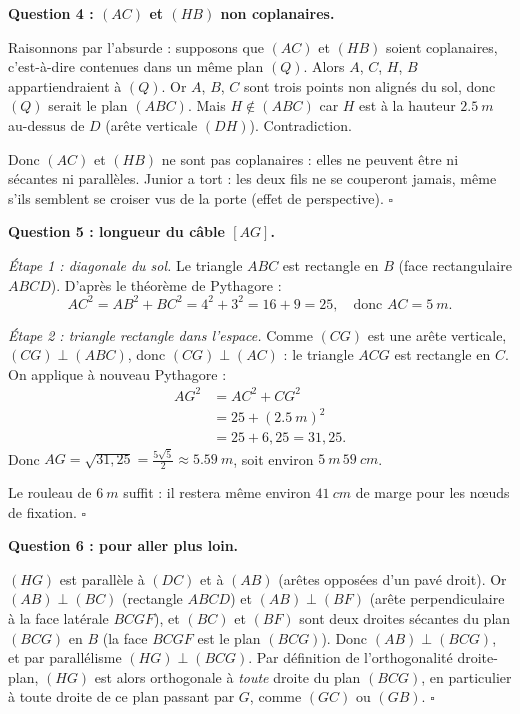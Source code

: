 \documentclass[11pt]{article}
\begin{document}
\begin{exoresolu}
\medskip
\textbf{Question 4 : $(AC)$ et $(HB)$ non coplanaires.}

Raisonnons par l'absurde : supposons que $(AC)$ et $(HB)$ soient coplanaires, c'est-à-dire contenues dans un même plan $(Q)$. Alors $A$, $C$, $H$, $B$ appartiendraient à $(Q)$. Or $A$, $B$, $C$ sont trois points non alignés du sol, donc $(Q)$ serait le plan $(ABC)$. Mais $H \notin (ABC)$ car $H$ est à la hauteur $\SI{2,5}{m}$ au-dessus de $D$ (arête verticale $(DH)$). Contradiction.

Donc $(AC)$ et $(HB)$ ne sont pas coplanaires : elles ne peuvent être ni sécantes ni parallèles. Junior a tort : les deux fils ne se couperont jamais, même s'ils semblent se croiser vus de la porte (effet de perspective). $\square$

\medskip
\textbf{Question 5 : longueur du câble $[AG]$.}

\emph{Étape 1 : diagonale du sol.} Le triangle $ABC$ est rectangle en $B$ (face rectangulaire $ABCD$). D'après le théorème de Pythagore :
\[ AC^2 = AB^2 + BC^2 = 4^2 + 3^2 = 16 + 9 = 25, \quad \text{donc } AC = \SI{5}{m}. \]

\emph{Étape 2 : triangle rectangle dans l'espace.} Comme $(CG)$ est une arête verticale, $(CG) \perp (ABC)$, donc $(CG) \perp (AC)$ : le triangle $ACG$ est rectangle en $C$. On applique à nouveau Pythagore :
\begin{align*}
AG^2 &= AC^2 + CG^2 \\
&= 25 + (\SI{2,5}{m})^2 \\
&= 25 + 6,25 = 31,25.
\end{align*}
Donc $AG = \sqrt{31,25} = \frac{5\sqrt{5}}{2} \approx \SI{5,59}{m}$, soit environ $\SI{5}{m}\,\SI{59}{cm}$.

Le rouleau de $\SI{6}{m}$ suffit : il restera même environ $\SI{41}{cm}$ de marge pour les nœuds de fixation. $\square$

\medskip
\textbf{Question 6 : pour aller plus loin.}

$(HG)$ est parallèle à $(DC)$ et à $(AB)$ (arêtes opposées d'un pavé droit). Or $(AB) \perp (BC)$ (rectangle $ABCD$) et $(AB) \perp (BF)$ (arête perpendiculaire à la face latérale $BCGF$), et $(BC)$ et $(BF)$ sont deux droites sécantes du plan $(BCG)$ en $B$ (la face $BCGF$ est le plan $(BCG)$). Donc $(AB) \perp (BCG)$, et par parallélisme $(HG) \perp (BCG)$. Par définition de l'orthogonalité droite-plan, $(HG)$ est alors orthogonale à \emph{toute} droite du plan $(BCG)$, en particulier à toute droite de ce plan passant par $G$, comme $(GC)$ ou $(GB)$. $\square$
\end{exoresolu}
\end{document}
